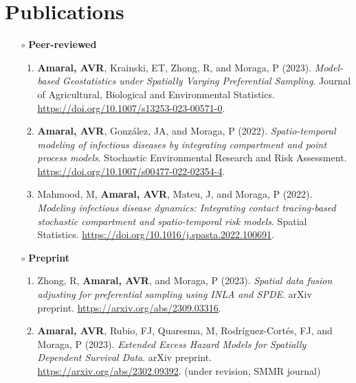 \documentclass[10pt, ]{article}
\begin{document}
	\noindent\makebox[\linewidth]{\rule{\paperwidth}{0.5pt}}
	
	\vspace{-12pt}
	\section*{Publications} \vspace{-5pt}
	
	\begin{itemize}[noitemsep, topsep=0pt]
		\item[$\circ$]  \textbf{Peer-reviewed}
		\begin{enumerate}[label*=\arabic*., noitemsep]
		\item  \textbf{Amaral, AVR}, Krainski, ET, Zhong, R, and Moraga, P (2023). \textit{Model-based Geostatistics under Spatially Varying Preferential Sampling}.  Journal of Agricultural, Biological and Environmental Statistics. \url{https://doi.org/10.1007/s13253-023-00571-0}.
		\item  \textbf{Amaral, AVR}, González, JA, and Moraga, P (2022). \textit{Spatio-temporal modeling of infectious diseases by integrating compartment and point process models}. Stochastic Environmental Research and Risk Assessment. \url{https://doi.org/10.1007/s00477-022-02354-4}.
		\item  Mahmood, M, \textbf{Amaral, AVR}, Mateu, J, and Moraga, P (2022). \textit{Modeling infectious disease dynamics: Integrating contact tracing-based stochastic compartment and spatio-temporal risk models}. Spatial Statistics. \url{https://doi.org/10.1016/j.spasta.2022.100691}.
		\end{enumerate}
		\item[$\circ$] \textbf{Preprint}
		\begin{enumerate}[label*=\arabic*., noitemsep]
			\item  Zhong, R, \textbf{Amaral, AVR}, and Moraga, P (2023).\textit{ Spatial data fusion adjusting for preferential sampling using INLA and SPDE}. arXiv preprint. \href{https://arxiv.org/abs/2309.03316}{\url{https://arxiv.org/abs/2309.03316}}.
			\item  \textbf{Amaral, AVR}, Rubio, FJ, Quaresma, M, Rodríguez-Cortés, FJ, and Moraga, P (2023). \textit{Extended Excess Hazard Models for Spatially Dependent Survival Data}. arXiv preprint. \href{https://arxiv.org/abs/2302.09392}{\url{https://arxiv.org/abs/2302.09392}}. (under revision, SMMR journal)
		\end{enumerate}
	\end{itemize}
	\vspace{-2pt}
	
\end{document}
